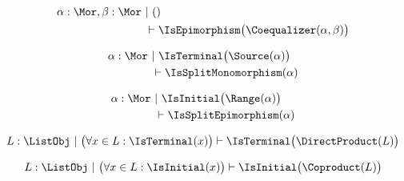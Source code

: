 \begin{sequent}
\begin{align*}
  \alpha:\Mor, \beta:\Mor  ~&|~ () \\
  &\vdash \IsEpimorphism\big( \Coequalizer( \alpha, \beta ) \big)
\end{align*}
\end{sequent}

\begin{sequent}\label{sequent:no_proper_context_7}
\begin{align*}
  \alpha:\Mor ~&|~ \IsTerminal\big( \Source( \alpha ) \big)\\
  &\vdash \IsSplitMonomorphism( \alpha )
\end{align*}
\end{sequent}

\begin{sequent}\label{sequent:no_proper_context_8}
\begin{align*}
  \alpha:\Mor ~&|~ \IsInitial\big( \Range( \alpha ) \big)\\
  &\vdash \IsSplitEpimorphism( \alpha )
\end{align*}
\end{sequent}

\begin{sequent}
\begin{align*}
  L: \ListObj ~|~ \big(\forall x \in L: \IsTerminal(x)\big) \vdash \IsTerminal\big( \DirectProduct( L ) \big)
\end{align*}
\end{sequent}

\begin{sequent}
\begin{align*}
  L: \ListObj ~|~ \big(\forall x \in L: \IsInitial(x)\big) \vdash \IsInitial\big( \Coproduct( L ) \big)
\end{align*}
\end{sequent}



